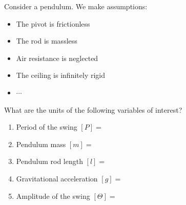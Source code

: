 \documentclass{workbook}
\begin{document}
\begin{slide}
Consider a pendulum. We make assumptions:
	\begin{itemize}
		\item The pivot is frictionless
		\item The rod is massless
		\item Air resistance is neglected
		\item The ceiling is infinitely rigid
		\item $\cdots$
	\end{itemize}


\begin{parts}
	\item What are the units of the following variables of interest?
	\begin{enumerate}
		\item Period of the swing $[P] =$ 
		\item Pendulum mass $[m]=$
		\item Pendulum rod length $[l]=$
		\item Gravitational acceleration $[g]=$
		\item Amplitude of the swing $[\Theta]=$
	\end{enumerate}
	

\end{parts}

\end{slide}
\end{document}
